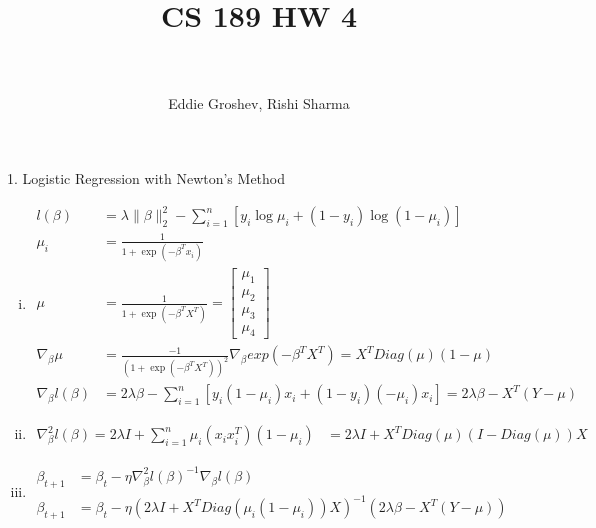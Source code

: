 \documentclass[paper=a4, fontsize=11pt]{scrartcl} %
\title{	
\normalfont \normalsize 
\horrule{0.5pt} \\[0.4cm] %
\huge CS 189 HW 4 \\ %
\horrule{2pt} \\[-0.1cm] %
}
\author{Eddie Groshev, Rishi Sharma}
\numberwithin{equation}{section} %
\numberwithin{figure}{section} %
\numberwithin{table}{section} %
\begin{document}
	
\maketitle %


{\Large 1. Logistic Regression with Newton's Method \indent }
\\
\begin{enumerate}[(i)]

\item
\begin{align*}
l(\beta) &=  \lambda\|\beta\|^2_2 -\sum_{i=1}^n \left[y_i\log\mu_i + (1-y_i)\log(1-\mu_i)\right]\\
\mu_i &= \frac{1}{1+\exp{(-\beta^Tx_i)}}\\
\mu &= \frac{1}{1+\exp{(-\beta^TX^T)}}=\begin{bmatrix}\mu_1\\\mu_2\\\mu_3\\\mu_4\end{bmatrix}\\
\nabla_\beta \mu &= \frac{-1}{(1+\exp{(-\beta^TX^T)})^2}\nabla_\beta exp{(-\beta^TX^T)}=X^TDiag(\mu)(1-\mu)\\
\nabla_\beta l(\beta) &= 2\lambda\beta - \sum_{i=1}^n[y_i(1-\mu_i)x_i+(1-y_i)(-\mu_i)x_i] = \boxed{2\lambda\beta - X^T(Y-\mu)}
\end{align*}

\item
\begin{align*}
\nabla_\beta^2l(\beta) = 2\lambda I + \sum_{i=1}^n \mu_i(x_ix_i^T)(1-\mu_i) &= \boxed{2\lambda I + X^TDiag(\mu)(I-Diag(\mu))X}
\end{align*}

\item
\begin{align*}
\beta_{t+1} &= \beta_{t} - \eta\nabla_\beta^2l(\beta)^{-1}\nabla_\beta l(\beta)\\
\beta_{t+1} &= \boxed{\beta_{t} - \eta(2\lambda I + X^TDiag(\mu_i(1-\mu_i))X)^{-1}(2\lambda\beta - X^T(Y-\mu))}
\end{align*}


\end{enumerate}
\end{document}
